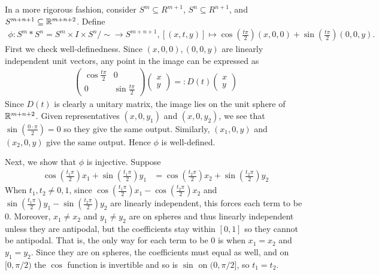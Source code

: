 \documentclass[12pt]{article}
\begin{document}
\begin{problem}[2]
In a more rigorous fashion, consider $ S^{m} \subseteq R^{m+1}$, $ S^{n} \subseteq R^{n+1}$, and $ S^{m+n+1} \subseteq \mathbb{R}^{m+n+2}$. Define
\begin{align*}
	\phi: S^{m}*S^{n}= S^{m} \times I \times S^{n} / \sim \to S^{m+n+1}, [(x,t,y)] \mapsto \cos \left( \frac{t \pi}{ 2} \right) (x,0,0) + \sin \left( \frac{t \pi}{ 2} \right) (0,0,y).
\end{align*}
First we check well-definedness. Since $ (x,0,0),(0,0,y)$ are linearly independent unit vectors, any point in the image can be expressed as
\begin{align*}
	\begin{pmatrix} \cos \frac{t \pi}{ 2} &0\\0& \sin \frac{t \pi}{ 2}  \end{pmatrix} \begin{pmatrix} x\\y \end{pmatrix} =: D(t) \begin{pmatrix} x\\y \end{pmatrix} 
\end{align*}
Since $ D(t)$ is clearly a unitary matrix, the image lies on the unit sphere of $ \mathbb{R}^{m+n+2}$. Given representatives $ (x,0,y_1)$ and $ (x,0,y_2)$, we see that $ \sin \left( \frac{0 \cdot  \pi}{2 } \right) =0$ so they give the same output. Similarly, $ (x_1,0,y)$ and $ (x_2,0,y)$ give the same output. Hence $ \phi$ is well-defined.

Next, we show that $ \phi$ is injective. Suppose
\begin{align*}
	\cos \left( \frac{t_1 \pi}{ 2} \right) x_1 + \sin \left( \frac{t_1 \pi}{ 2} \right) y_1 &= \cos \left( \frac{t_2 \pi}{ 2} \right) x_2 + \sin \left( \frac{t_2 \pi}{ 2} \right) y_2 
\end{align*}
When $ t_1 , t_2 \neq 0,1$, since $ \cos \left( \frac{t_1 \pi}{ 2} \right) x_1 - \cos \left( \frac{t_2 \pi}{ 2} \right) x_2$ and $ \sin \left( \frac{t_1 \pi }{ 2}  \right)y_1 - \sin \left( \frac{t_2 \pi}{ 2} \right) y_2 $ are linearly independent, this forces each term to be 0. Moreover, $ x_1 \neq x_2$ and $ y_1 \neq y_2$ are on spheres and thus linearly independent unless they are antipodal, but the coefficients stay within $ [0,1]$ so they cannot be antipodal. That is, the only way for each term to be 0 is when $ x_1 = x_2$ and $ y_1 = y_2$. Since they are on spheres, the coefficients must equal as well, and on $ [0, \pi /2)$ the  $ \cos$ function is invertible and so is $ \sin$ on $ (0, \pi /2]$, so $ t_1 = t_2$.


\end{problem}
\end{document}
